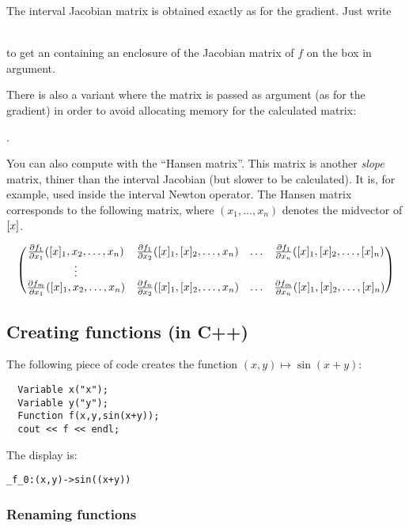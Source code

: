 The interval Jacobian matrix is obtained exactly as for the gradient.
Just write \\
\centerline{}\\ to get an 
containing an enclosure of the Jacobian matrix of $f$ on the box in argument.

There is also a variant where the matrix is passed as argument
(as for the gradient) in order to avoid allocating memory for the calculated matrix:\\
\centerline{.}

You can also compute with \ibex the ``Hansen matrix''. This matrix
is another {\it slope} matrix, thiner than the interval Jacobian (but slower to be calculated).
It is, for example, used inside the interval Newton operator.
The Hansen matrix corresponds to the following matrix, where $(x_1,\ldots,x_n)$ denotes
the midvector of $[x]$.

$$\begin{pmatrix}
\frac{\partial f_1}{\partial x_1}([x]_1,x_2,\ldots,x_n) & \frac{\partial f_1}{\partial x_2}([x]_1,[x]_2,\ldots,x_n) & \ldots & \frac{\partial f_1}{\partial x_n}([x]_1,[x]_2,\ldots,[x]_n) \\
\vdots & \\
\frac{\partial f_m}{\partial x_1}([x]_1,x_2,\ldots,x_n) & \frac{\partial f_n}{\partial x_2}([x]_1,[x]_2,\ldots,x_n) & \ldots & \frac{\partial f_m}{\partial x_n}([x]_1,[x]_2,\ldots,[x]_n) \\
\end{pmatrix}$$

\subsection{Creating functions (in C++)}\label{sec:mod-func-cpp}

The following piece of code creates the function
$(x,y)\mapsto \sin(x+y)$:

\begin{lstlisting}	
  Variable x("x");
  Variable y("y");
  Function f(x,y,sin(x+y));
  cout << f << endl;
\end{lstlisting}

The display is:
\begin{lstlisting}
_f_0:(x,y)->sin((x+y))
\end{lstlisting}

\subsubsection{Renaming functions}

